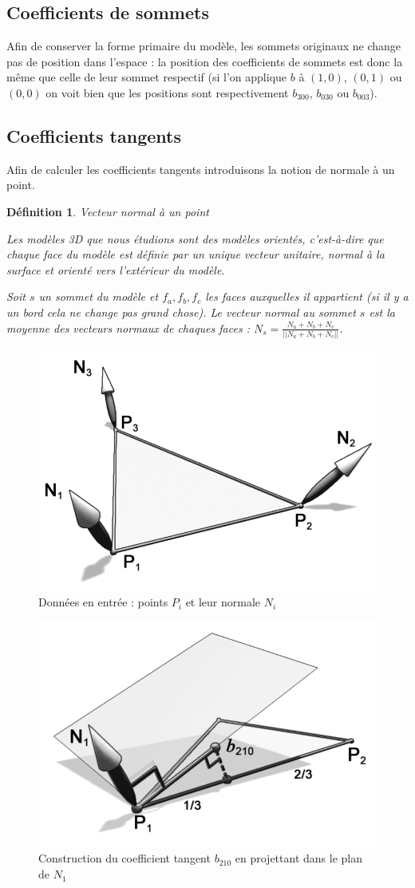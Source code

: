 \documentclass{article}
\newtheorem{definition}{Définition}
\begin{document}
\subsection{Coefficients de sommets}
Afin de conserver la forme primaire du modèle, les sommets originaux ne change
pas de position dans l'espace : la position des coefficients de sommets est
donc la même que celle de leur sommet respectif (si l'on applique $b$ à
$(1,0)$, $(0,1)$ ou $(0,0)$ on voit bien que les positions sont respectivement
$b_{300}$, $b_{030}$ ou $b_{003}$).

\subsection{Coefficients tangents}
Afin de calculer les coefficients tangents introduisons la notion de normale à
un point.

\begin{definition}{Vecteur normal à un point}

Les modèles 3D que nous étudions sont des modèles orientés, c'est-à-dire que
chaque face du modèle est définie par un unique vecteur unitaire, normal à la
surface et orienté vers l'extérieur du modèle.

Soit $s$ un sommet du modèle et $f_a,f_b,f_c$ les faces auxquelles il
appartient (si il y a un bord cela ne change pas grand chose). Le vecteur
normal au sommet $s$ est la moyenne des vecteurs normaux de chaques faces :
$N_s = \frac{N_a + N_b + N_c}{||N_a + N_b + N_c||}$.
\end{definition}

\begin{figure}[ht!]
\centering
    \includegraphics[width=0.4\linewidth]{normals}
    \caption{Données en entrée : points $P_i$ et leur normale $N_i$}
    \label{fig:normals}
\end{figure}

\begin{figure}[ht!]
\centering
    \includegraphics[width=0.4\linewidth]{tangent}
    \caption{Construction du coefficient tangent $b_210$ en projettant dans le
plan de $N_1$}
    \label{fig:tangent}
\end{figure}
\end{document}
